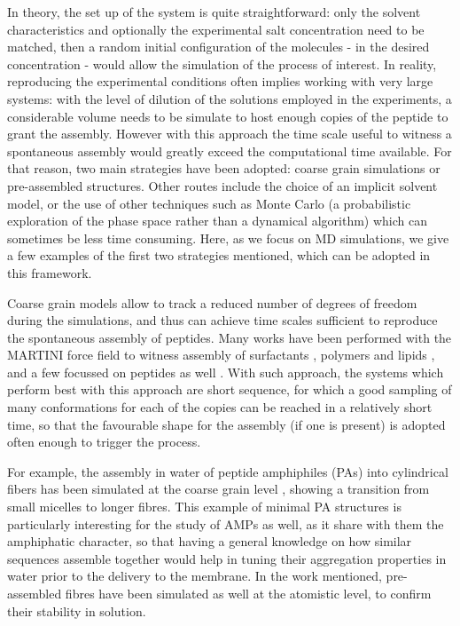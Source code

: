 In theory, the set up of the system is quite straightforward: only the solvent characteristics and optionally the experimental salt concentration need to be matched, then a random initial configuration of the molecules - in the desired concentration - would allow the simulation of the process of interest.
%
In reality, reproducing the experimental conditions often implies working with very large systems: with the level of dilution of the solutions employed in the experiments, a considerable volume needs to be simulate to host enough copies of the peptide to grant the assembly.
%
However with this approach the time scale useful to witness a spontaneous assembly would greatly exceed the computational time available. For that reason, two main strategies have been adopted: coarse grain simulations or pre-assembled structures. Other routes include the choice of an implicit solvent model, or the use of other techniques such as Monte Carlo (a probabilistic exploration of the phase space rather than a dynamical algorithm) which can sometimes be less time consuming. Here, as we focus on MD simulations, we give a few examples of the first two strategies mentioned, which can be adopted in this framework.

Coarse grain models allow to track a reduced number of degrees of freedom during the simulations, and thus can achieve time scales sufficient to reproduce the spontaneous assembly of peptides. Many works have been performed with the MARTINI force field to witness assembly of surfactants \cite{Wu2012}, polymers \cite{Wang2012poly,Bochicchio2017} and lipids \cite{Lee2011,Brocos2012}, and a few focussed on peptides as well \cite{Guo2012,Seo2012}.
%
With such approach, the systems which perform best with this approach are short sequence, for which a good sampling of many conformations for each of the copies can be reached in a relatively short time, so that the favourable shape for the assembly (if one is present) is adopted often enough to trigger the process.

For example, the assembly in water of peptide amphiphiles (PAs) into cylindrical fibers has been simulated at the coarse grain level \cite{Lee2012}, showing a transition from small micelles to longer fibres. This example of minimal PA structures is particularly interesting for the study of AMPs as well, as it share with them the amphiphatic character, so that having a general knowledge on how similar sequences assemble together would help in tuning their aggregation properties in water prior to the delivery to the membrane.
%
In the work mentioned, pre-assembled fibres have been simulated as well at the atomistic level, to confirm their stability in solution.

